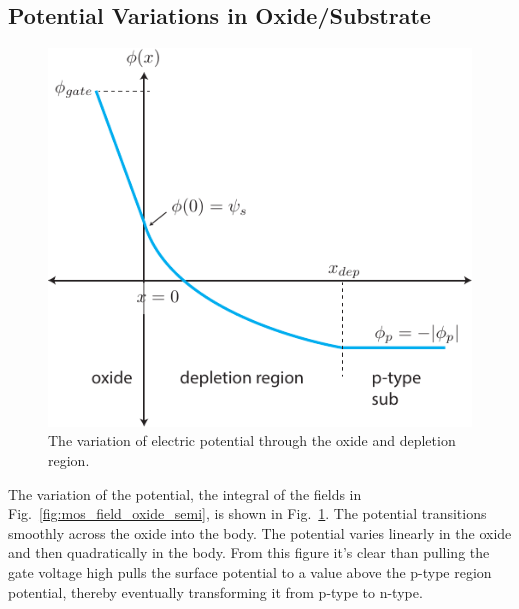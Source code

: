\subsection{Potential Variations in Oxide/Substrate}
\begin{figure}[tbh]
\begin{center}
\includegraphics[width=.5\columnwidth]{MOS_potential}
\end{center}
\caption{The variation of electric potential through the oxide and depletion region. } \label{fig:MOS_potential}
\end{figure}

The variation of the potential, the integral of the fields in Fig.~\ref{fig:mos_field_oxide_semi}, is shown in Fig.~\ref{fig:MOS_potential}.  The potential transitions smoothly across the oxide into the body.  The potential varies linearly in the oxide and then quadratically in the body.  From this figure it's clear than pulling the gate voltage high pulls the surface potential to a value above the p-type region potential, thereby eventually transforming it from p-type to n-type. 
